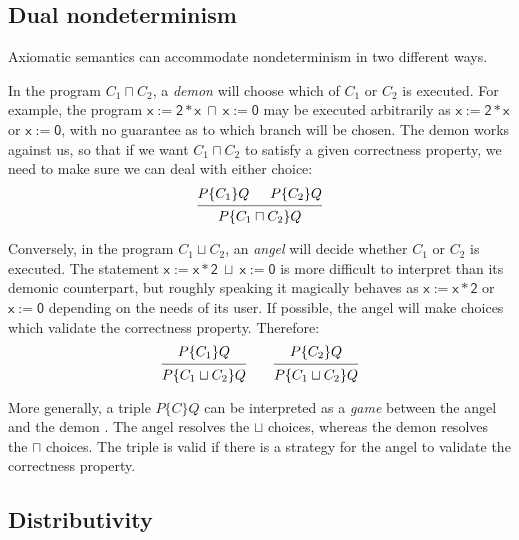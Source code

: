 \documentclass[11pt,oneside]{book}
\theoremstyle{definition}
\newcommand{\kw}[1]{\ensuremath{ \mathsf{#1} }}
\newcommand{\htr}[3]{{ {#1} \lbrace {#2} \rbrace {#3} }}
\begin{document}

\subsection{Dual nondeterminism} %

Axiomatic semantics
can accommodate nondeterminism in two different ways.

In the program $C_1 \sqcap C_2$,
a \emph{demon} will choose which of $C_1$ or $C_2$ is executed.
For example,
the program $\kw{x := 2 * x} \: \sqcap \: \kw{x := 0}$
may be executed arbitrarily as $\kw{x := 2 * x}$ or $\kw{x := 0}$,
with no guarantee as to which branch will be chosen.
The demon works against us,
so that if we want $C_1 \sqcap C_2$ to satisfy
a given correctness property,
we need to make sure we can deal with either choice:
\[
  \begin{prooftree}
    \hypo{\htr{P}{C_1}{Q}}
    \hypo{\htr{P}{C_2}{Q}}
    \infer2{\htr{P}{C_1 \sqcap C_2}{Q}}
  \end{prooftree}
\]

Conversely,
in the program $C_1 \sqcup C_2$,
an \emph{angel} will decide whether $C_1$ or $C_2$ is executed.
The statement $\kw{x := x * 2} \: \sqcup \: \kw{x := 0}$
is more difficult to interpret than its demonic counterpart,
but roughly speaking it magically behaves as
$\kw{x := x * 2}$ or $\kw{x := 0}$
depending on the needs of its user.
If possible,
the angel will make choices which validate
the correctness property.
Therefore:
\[
  \begin{prooftree}
    \hypo{\htr{P}{C_1}{Q}}
    \infer1{\htr{P}{C_1 \sqcup C_2}{Q}}
  \end{prooftree}
  \qquad
  \begin{prooftree}
    \hypo{\htr{P}{C_2}{Q}}
    \infer1{\htr{P}{C_1 \sqcup C_2}{Q}}
  \end{prooftree}
\]

More generally,
a triple $\htr{P}{C}{Q}$
can be interpreted as a \emph{game}
between the angel and the demon \citep[Chapter 14]{refcal}.
The angel resolves the $\sqcup$ choices,
whereas the demon resolves the $\sqcap$ choices.
The triple is valid if there is a strategy
for the angel
to validate the correctness property.


\subsection{Distributivity} %
\end{document}
